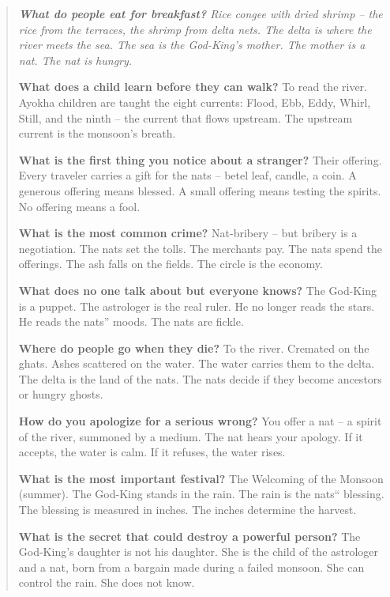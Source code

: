 \documentclass[12pt,oneside]{book}
\newenvironment{almanac}
  {\begin{quote}\small\itshape}
  {\end{quote}}
\begin{document}
\vspace{1em}
\begin{almanac}
\textbf{What do people eat for breakfast?} Rice congee with dried shrimp -- the rice from the terraces, the shrimp from delta nets. The delta is where the river meets the sea. The sea is the God-King's mother. The mother is a nat. The nat is hungry.

\textbf{What does a child learn before they can walk?} To read the river. Ayokha children are taught the eight currents: Flood, Ebb, Eddy, Whirl, Still, and the ninth -- the current that flows upstream. The upstream current is the monsoon's breath.

\textbf{What is the first thing you notice about a stranger?} Their offering. Every traveler carries a gift for the nats -- betel leaf, candle, a coin. A generous offering means blessed. A small offering means testing the spirits. No offering means a fool.

\textbf{What is the most common crime?} Nat-bribery -- but bribery is a negotiation. The nats set the tolls. The merchants pay. The nats spend the offerings. The ash falls on the fields. The circle is the economy.

\textbf{What does no one talk about but everyone knows?} The God-King is a puppet. The astrologer is the real ruler. He no longer reads the stars. He reads the nats'' moods. The nats are fickle.

\textbf{Where do people go when they die?} To the river. Cremated on the ghats. Ashes scattered on the water. The water carries them to the delta. The delta is the land of the nats. The nats decide if they become ancestors or hungry ghosts.

\textbf{How do you apologize for a serious wrong?} You offer a nat -- a spirit of the river, summoned by a medium. The nat hears your apology. If it accepts, the water is calm. If it refuses, the water rises.

\textbf{What is the most important festival?} The Welcoming of the Monsoon (summer). The God-King stands in the rain. The rain is the nats`` blessing. The blessing is measured in inches. The inches determine the harvest.

\textbf{What is the secret that could destroy a powerful person?} The God-King's daughter is not his daughter. She is the child of the astrologer and a nat, born from a bargain made during a failed monsoon. She can control the rain. She does not know.
\end{almanac}
\end{document}
